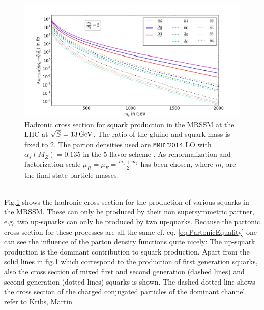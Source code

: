 \begin{figure}[!htpb]
\begin{center}
\includegraphics[scale=.45]{figures/MRSSM:q+q->sq+sq_mr=2_seperated}
\caption{Hadronic cross section for squark production in the MRSSM at the LHC at $\sqrt{S} = \unit[13]{GeV}$. The ratio of the gluino and squark mass is fixed to 2. The parton densities used are $\mathtt{MMHT2014}$ LO with $\alpha_s(M_Z) = 0.135$ in the 5-flavor scheme \cite{Harland-Lang:2014zoa}. As renormalization and factorization scale $\mu_R = \mu_F = \frac{m_1 + m_2}{2}$ has been chosen, where $m_i$ are the final state particle masses.} \label{fig:TreeXsection}
\end{center}
\end{figure}\\
Fig.\ref{fig:TreeXsection} shows the hadronic cross section for the production of various squarks in the MRSSM. These can only be produced by their non supersymmetric partner, e.g. two up-squarks can only be produced by two up-quarks. Because the partonic cross section for these processes are all the same cf. eq. \ref{eq:PartonicEquality} one can see the influence of the parton density functions quite nicely: The up-squark production is the dominant contribution to squark production. Apart from the solid lines in fig.\ref{fig:TreeXsection} which correspond to the production of first generation squarks, also the cross section of mixed first and second generation (dashed lines) and second generation (dotted lines) squarks is shown. The dashed dotted line shows the cross section of the charged conjugated particles of the dominant channel.\\
refer to Kribs, Martin
